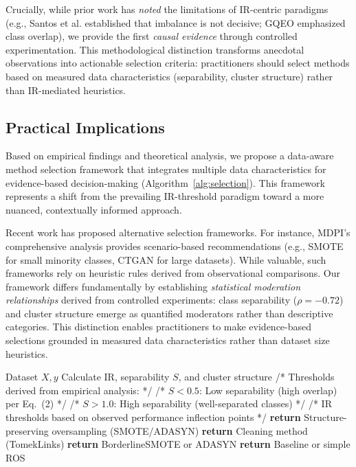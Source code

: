 \documentclass{ijSmartGrid}
\theoremstyle{definition}
\begin{document}
Crucially, while prior work has \textit{noted} the limitations of IR-centric paradigms (e.g., Santos et al. \cite{santos2023} established that imbalance is not decisive; GQEO \cite{gqeo2025} emphasized class overlap), we provide the first \textit{causal evidence} through controlled experimentation. This methodological distinction transforms anecdotal observations into actionable selection criteria: practitioners should select methods based on measured data characteristics (separability, cluster structure) rather than IR-mediated heuristics.

\subsection{Practical Implications}
\indent Based on empirical findings and theoretical analysis, we propose a data-aware method selection framework that integrates multiple data characteristics for evidence-based decision-making (Algorithm~\ref{alg:selection}). This framework represents a shift from the prevailing IR-threshold paradigm toward a more nuanced, contextually informed approach.

Recent work has proposed alternative selection frameworks. For instance, MDPI's comprehensive analysis \cite{mdpi2026} provides scenario-based recommendations (e.g., SMOTE for small minority classes, CTGAN for large datasets). While valuable, such frameworks rely on heuristic rules derived from observational comparisons. Our framework differs fundamentally by establishing \textit{statistical moderation relationships} derived from controlled experiments: class separability ($\rho=-0.72$) and cluster structure emerge as quantified moderators rather than descriptive categories. This distinction enables practitioners to make evidence-based selections grounded in measured data characteristics rather than dataset size heuristics.

\begin{algorithm}[!ht]
\caption{Data-Aware Oversampling Selection}
\label{alg:selection}
\begin{algorithmic}[1]
\REQUIRE Dataset $X, y$
\STATE Calculate IR, separability $S$, and cluster structure
\STATE /* Thresholds derived from empirical analysis: */
\STATE /* $S < 0.5$: Low separability (high overlap) per Eq.~(2) */
\STATE /* $S > 1.0$: High separability (well-separated classes) */
\STATE /* IR thresholds based on observed performance inflection points */
    \STATE \textbf{return} Structure-preserving oversampling (SMOTE/ADASYN)
    \STATE \textbf{return} Cleaning method (TomekLinks)
    \STATE \textbf{return} BorderlineSMOTE or ADASYN
\ELSE
    \STATE \textbf{return} Baseline or simple ROS
\ENDIF
\end{algorithmic}
\end{algorithm}
\end{document}
